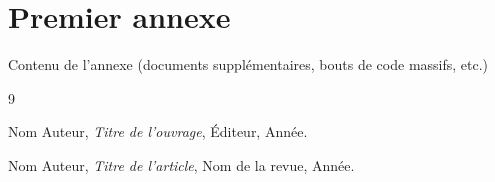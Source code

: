 \chapter{Premier annexe}
Contenu de l'annexe (documents supplémentaires, bouts de code massifs, etc.)

\begin{thebibliography}{9}

Nom Auteur, \emph{Titre de l'ouvrage}, Éditeur, Année.

Nom Auteur, \emph{Titre de l'article}, Nom de la revue, Année.

\end{thebibliography}
